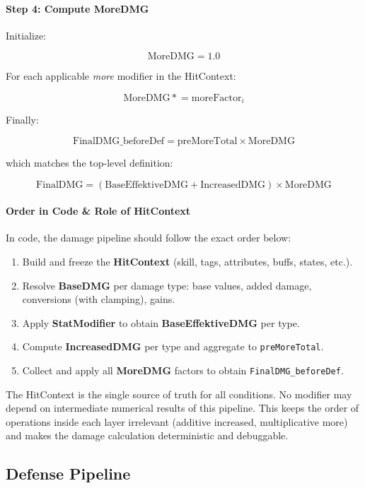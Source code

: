 \paragraph{Step 4: Compute MoreDMG}

Initialize:

\[
\text{MoreDMG} = 1.0
\]

For each applicable \emph{more} modifier in the HitContext:

\[
\text{MoreDMG} \mathrel{*}= \text{moreFactor}_i
\]

Finally:

\[
\text{FinalDMG\_beforeDef} = \text{preMoreTotal} \times \text{MoreDMG}
\]

which matches the top-level definition:

\[
\text{FinalDMG} = (\text{BaseEffektiveDMG} + \text{IncreasedDMG}) \times \text{MoreDMG}
\]


\paragraph{Order in Code \& Role of HitContext}

In code, the damage pipeline should follow the exact order below:

\begin{enumerate}
	\item Build and freeze the \textbf{HitContext} (skill, tags, attributes, buffs, states, etc.).
	\item Resolve \textbf{BaseDMG} per damage type:
	base values, added damage, conversions (with clamping), gains.
	\item Apply \textbf{StatModifier} to obtain \textbf{BaseEffektiveDMG} per type.
	\item Compute \textbf{IncreasedDMG} per type and aggregate to \texttt{preMoreTotal}.
	\item Collect and apply all \textbf{MoreDMG} factors to obtain \texttt{FinalDMG\_beforeDef}.
\end{enumerate}

The HitContext is the single source of truth for all conditions. No modifier may depend
on intermediate numerical results of this pipeline. This keeps the order of operations
inside each layer irrelevant (additive increased, multiplicative more) and makes the
damage calculation deterministic and debuggable.

\subsection{Defense Pipeline}
\label{subsec:defense-pipeline}

